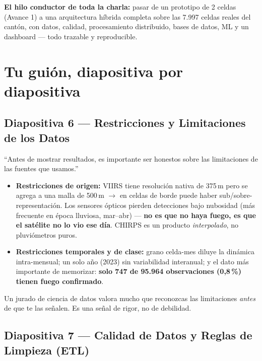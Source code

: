 \documentclass[11pt,a4paper]{article}
\begin{document}
\noindent\textbf{El hilo conductor de toda la charla:} pasar de un prototipo de 2 celdas (Avance 1) a una arquitectura h\'ibrida completa sobre las 7.997 celdas reales del cant\'on, con datos, calidad, procesamiento distribuido, bases de datos, ML y un dashboard --- todo trazable y reproducible.

\newpage
\section{Tu gui\'on, diapositiva por diapositiva}

\subsection{Diapositiva 6 --- Restricciones y Limitaciones de los Datos}

\begin{decirbox}
``Antes de mostrar resultados, es importante ser honestos sobre las limitaciones de las fuentes que usamos.''
\begin{itemize}
    \item \textbf{Restricciones de origen:} VIIRS tiene resoluci\'on nativa de 375\,m pero se agrega a una malla de 500\,m $\to$ en celdas de borde puede haber sub/sobre-representaci\'on. Los sensores \'opticos pierden detecciones bajo nubosidad (m\'as frecuente en \'epoca lluviosa, mar--abr) --- \textbf{no es que no haya fuego, es que el sat\'elite no lo vio ese d\'ia}. CHIRPS es un producto \emph{interpolado}, no pluvi\'ometros puros.
    \item \textbf{Restricciones temporales y de clase:} grano celda-mes diluye la din\'amica intra-mensual; un solo a\~no (2023) sin variabilidad interanual; y el dato m\'as importante de memorizar: \textbf{solo 747 de 95.964 observaciones (0,8\,\%) tienen fuego confirmado}.
\end{itemize}
\end{decirbox}

\begin{porquebox}
Un jurado de ciencia de datos valora mucho que reconozcas las limitaciones \emph{antes} de que te las se\~nalen. Es una se\~nal de rigor, no de debilidad.
\end{porquebox}

\subsection{Diapositiva 7 --- Calidad de Datos y Reglas de Limpieza (ETL)}
\end{document}
